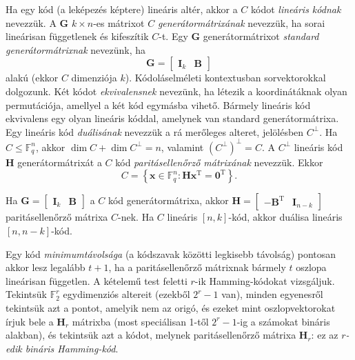 \documentclass[%
	DIV=15,appendixprefix]{scrreprt}
\theoremstyle{definition}
\theoremstyle{remark}
\DeclareMathOperator{\T}{T}
\begin{document}
Ha egy kód (a leképezés képtere) lineáris altér, akkor a $ C $ kódot \emph{lineáris kódnak}
nevezzük. A $ \mathbf{ G } $ $ k \times n $-es mátrixot $ C $ \emph{generátormátrixának} nevezzük,
ha sorai lineárisan függetlenek és kifeszítik $ C $-t. Egy $ \mathbf{ G } $ generátormátrixot
\emph{standard generátormátrixnak} nevezünk, ha
\begin{equation*}
	\mathbf{ G } = \begin{bmatrix}
		\mathbf{ I }_{ k } & \mathbf{ B }
	\end{bmatrix}
\end{equation*}
alakú (ekkor $ C $ dimenziója $ k $). Kódoláselméleti kontextusban sorvektorokkal dolgozunk. Két
kódot  \emph{ekvivalensnek} nevezünk, ha létezik a koordinátáknak olyan permutációja,
amellyel a két kód egymásba vihető. Bármely lineáris kód ekvivalens egy olyan lineáris kóddal,
amelynek van standard generátormátrixa.
%
Egy lineáris kód \emph{duálisának} nevezzük a rá merőleges alteret, jelölésben $ C^{ \perp } $. Ha
$ C \le \mathbb{ F }_{ q }^{ n } $, akkor $ \dim C + \dim C^{ \perp } = n $, valamint $ \left(
C^{ \perp } \right)^{ \perp } = C $. A $ C^{ \perp } $ lineáris kód $ \mathbf{ H } $
generátormátrixát a $ C $ kód \emph{paritásellenőrző mátrixának} nevezzük. Ekkor
\begin{equation*}
	C = \left\{ \mathbf{ x } \in \mathbb{ F }_{ q }^{ n } \colon \mathbf{ H } \mathbf{ x }^{ \T }
	= \mathbf{ 0 }^{ \T } \right\}.
\end{equation*}

Ha $ \mathbf{ G } = \begin{bmatrix} \mathbf{ I }_{ k } & \mathbf{ B } \end{bmatrix} $ a $ C $ kód
generátormátrixa, akkor $ \mathbf{ H } = \begin{bmatrix} - \mathbf{ B }^{ \T } &
\mathbf{ I }_{ n - k } \end{bmatrix} $ paritásellenőrző mátrixa $ C $-nek. Ha $ C $ lineáris
$ \left[ n,{} k \right] $-kód, akkor duálisa lineáris $ \left[ n,{} n - k \right] $-kód.

Egy kód \emph{minimumtávolsága} (a kódszavak közötti legkisebb távolság) pontosan akkor lesz
legalább $ t + 1 $, ha a paritásellenőrző mátrixnak bármely $ t $ oszlopa lineárisan független.
%
A kételemű test feletti $ r $-ik Hamming-kódokat vizsgáljuk. Tekintsük $ \mathbb{ F }_{ 2 }^{ r } $
egydimenziós altereit (ezekből $ 2^{ r } - 1 $ van), minden egyenesről tekintsük azt a pontot,
amelyik nem az origó, és ezeket mint oszlopvektorokat írjuk bele a $ \mathbf{ H }_{ r } $ mátrixba
(most speciálisan 1-től $ 2^{ r } - 1 $-ig a számokat bináris alakban), és tekintsük azt a kódot,
melynek paritásellenőrző mátrixa $ \mathbf{ H }_{ r } $: ez az \emph{$ r $-edik bináris
Hamming-kód}.
\end{document}
